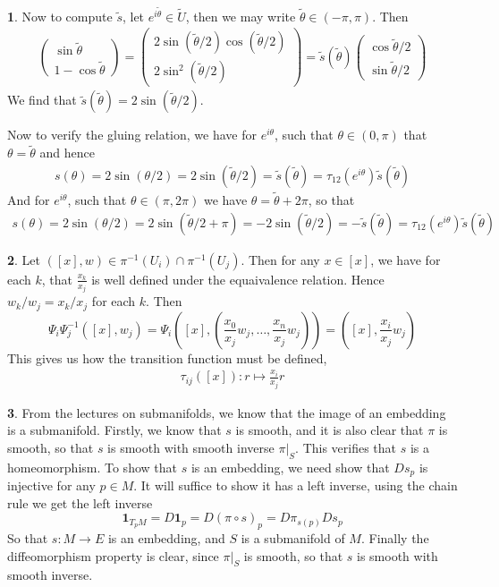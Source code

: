 \documentclass[10.5pt]{article}
\theoremstyle{definition}
\newtheorem{pb}{}
\newcommand{\tth}{\tilde{\theta}}
\begin{document}
\begin{pb}
        Now to compute \(\tilde{s}\), let \(e^{i\tth} \in \tilde{U}\), then we may write \(\tth \in (-\pi,\pi)\). Then
        \begin{align*}
            \begin{pmatrix} \sin\tth \\ 1-\cos\tth \end{pmatrix} = \begin{pmatrix} 2\sin(\tth/2)\cos(\tth/2) \\ 2\sin^2(\tth/2) \end{pmatrix}
            = \tilde{s}(\tth)\begin{pmatrix} \cos\tth/2 \\ \sin\tth/2 \end{pmatrix}
        \end{align*}
        We find that \(\tilde{s}(\tth) = 2\sin(\tth/2)\).

        Now to verify the gluing relation, we have for \(e^{i\theta}\), such that \(\theta \in (0,\pi)\) that \(\theta = \tth\) and hence
        \begin{align*}
            s(\theta) = 2\sin(\theta/2) = 2\sin(\tth/2) = \tilde{s}(\tth) = \tau_{12}(e^{i\theta})\tilde{s}(\tth)
        \end{align*}
        And for \(e^{i\theta}\), such that \(\theta \in (\pi,2\pi)\) we have \(\theta = \tth + 2\pi\), so that
        \begin{align*}
            s(\theta) = 2\sin(\theta/2) = 2\sin(\tth/2 + \pi) = -2\sin(\tth/2) = -\tilde{s}(\tth) = \tau_{12}(e^{i\theta})\tilde{s}(\tth)
        \end{align*}
    \end{pb}
    \begin{pb}
        Let \(([x],w) \in \pi^{-1}(U_i) \cap \pi^{-1}(U_j)\). Then for any \(x \in [x]\), we have for each \(k\), that
        \(\frac{x_k}{x_j}\) is well defined under the equaivalence relation. Hence \(w_k/w_j = x_k/x_j\) for each \(k\). Then
        \[\Psi_i\Psi_j^{-1}([x],w_j) = \Psi_i([x],(\frac{x_0}{x_j}w_j, \hdots, \frac{x_n}{x_j}w_j)) = ([x],\frac{x_i}{x_j}w_j)\]
        This gives us how the transition function must be defined,
        \begin{align*}
            \tau_{ij}([x]): r \mapsto \frac{x_i}{x_j}r
        \end{align*}
    \end{pb}
    \begin{pb}
        From the lectures on submanifolds, we know that the image of an embedding is a submanifold. Firstly, we know that \(s\) is smooth, and it is also clear that
        \(\pi\) is smooth, so that \(s\) is smooth with smooth inverse \(\pi\vert_S\). This verifies that \(s\) is a homeomorphism. To show that \(s\) is an embedding, we need show that
        \(Ds_p\) is injective for any \(p \in M\). It will suffice to show it has a left inverse, using the chain rule we get the left inverse 
        \[\mathbf{1}_{T_pM} = D\mathbf{1}_p = D(\pi\circ s)_p = D\pi_{s(p)}Ds_p\]
        So that \(s: M \to E\) is an embedding, and \(S\) is a submanifold of \(M\). Finally the diffeomorphism property is clear, since \(\pi \vert_S\) is smooth, so that
        \(s\) is smooth with smooth inverse.
    \end{pb}
\end{document}
